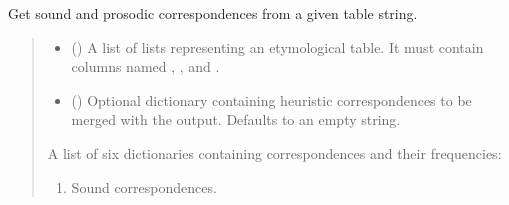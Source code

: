 \documentclass[letterpaper,10pt,english]{sphinxmanual}
\begin{document}
\begin{fulllineitems}
\label{\detokenize{documentation:loanpy.scminer.get_correspondences}}
\pysigstartsignatures
{}
\pysigstopsignatures
\sphinxAtStartPar
Get sound and prosodic correspondences from a given table string.
\begin{quote}\begin{description}
\begin{itemize}
\item {} 
\sphinxAtStartPar
{} () \textendash{} A list of lists representing an etymological table.
It must contain columns
named , , and .

\item {} 
\sphinxAtStartPar
{} () \textendash{} Optional dictionary containing heuristic correspondences
to be merged with the output. Defaults to an empty string.

\end{itemize}

\sphinxAtStartPar

\sphinxAtStartPar
A list of six dictionaries containing correspondences
and their frequencies:
\begin{enumerate}
%
\item {} 
\sphinxAtStartPar
Sound correspondences.


\end{enumerate}
\end{description}
\end{quote}
\end{fulllineitems}
\end{document}
